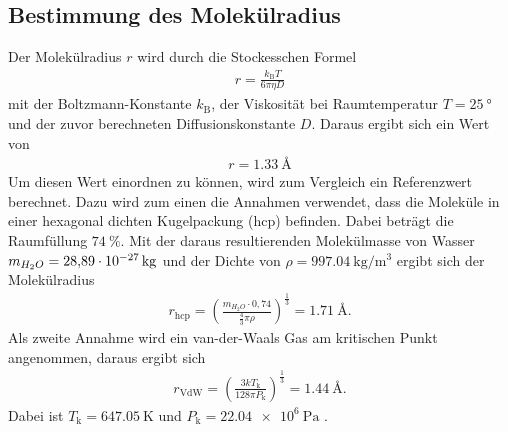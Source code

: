 \subsection{Bestimmung des Molekülradius}
\label{sec:AuswMolekuel}
Der Molekülradius $r$ wird durch die Stockesschen Formel
\begin{align*}
  r = \frac{k_\text{B} T}{6\pi\eta D}
\end{align*}
mit der Boltzmann-Konstante $k_\text{B}$, der Viskosität bei Raumtemperatur $T = \SI{25}{\degree}$
und der zuvor berechneten Diffusionskonstante $D$. Daraus ergibt sich ein Wert von
\begin{align*}
  r = \SI{1.33}{\angstrom}
\end{align*}
Um diesen Wert einordnen zu können, wird zum Vergleich ein Referenzwert berechnet.
Dazu wird zum einen die Annahmen verwendet, dass die Moleküle in einer
hexagonal dichten Kugelpackung (hcp) befinden. Dabei beträgt die Raumfüllung
$\SI{74}{\percent}$. Mit der daraus resultierenden Molekülmasse von Wasser
$m_{H_2O} = \SI{28.89d-27}{\kilo\gram}$ und der Dichte von
$\rho = \SI{997.04}{\kilo\gram\per\cubic\meter}$ \cite{hcp} ergibt sich der
Molekülradius
\begin{align*}
  r_\text{hcp} = \left(\frac{m_{H_2O}\cdot 0,74}{\frac{4}{3} \pi \rho }\right)^\frac{1}{3} = \SI{1.71}{\angstrom}.
\end{align*}
Als zweite Annahme wird ein van-der-Waals Gas am kritischen Punkt angenommen,
daraus ergibt sich
\begin{align*}
  r_\text{VdW} = \left(\frac{3kT_\text{k}}{128\pi P_\text{k}}\right)^\frac{1}{3} = \SI{1.44}{\angstrom}.
\end{align*}
Dabei ist $T_\text{k} = \SI{647.05}{\kelvin}$ und $P_\text{k} = \SI{22.04e6}{\pascal}$ \cite{VdW}.




